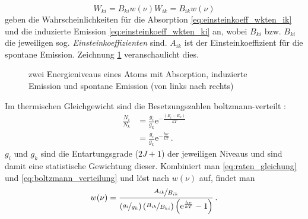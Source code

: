 \begin{subequations}\label{eq:einsteinkoeff_wkten}
	\begin{equation}\label{eq:einsteinkoeff_wkten_ik}
		W_{ki}=B_{ki}w(\nu)
	\end{equation}
	\begin{equation}\label{eq:einsteinkoeff_wkten_ki}
		W_{ik}=B_{ik}w(\nu)
	\end{equation}	
\end{subequations}
geben die Wahrscheinlichkeiten für die Absorption
\eqref{eq:einsteinkoeff_wkten_ik} und die induzierte Emission
\eqref{eq:einsteinkoeff_wkten_ki} an, wobei $B_{ki}$ bzw. $B_{ki}$ die
jeweiligen sog.
\textit{Einsteinkoeffizienten} sind. $A_{ik}$ ist der Einsteinkoeffizient für
die spontane Emission. Zeichnung \ref{fig:einstein_koeffizienten}
veranschaulicht dies.
\begin{figure}[h]
	\centering
	\caption[Einsteinkoeffizienten]{zwei Energieniveaus eines Atoms mit Absorption,
	induzierte Emission und spontane Emission (von links nach
	rechts)}\label{fig:einstein_koeffizienten}
\end{figure}
Im thermischen Gleichgewicht sind die Besetzungszahlen
boltzmann-verteilt \cite{demtroeder:ex3}:
\begin{equation}\label{eq:boltzmann_verteilung}
	\begin{split}
		\frac{N_i}{N_k}&=\frac{g_i}{g_k}\mathrm{e}^{-\frac{(E_i-E_k)}{kT}}\\[0.2cm]
		&=\frac{g_i}{g_k}\mathrm{e}^{-\frac{h\nu}{kT}}\,.
	\end{split}	
\end{equation}
$g_i$ und $g_k$ sind die Entartungsgrade ($2J+1$) der jeweiligen Niveaus und
sind damit eine statistische Gewichtung dieser.
Kombiniert man \eqref{eq:raten_gleichung} und \eqref{eq:boltzmann_verteilung}
und löst nach $w(\nu)$ auf, findet man
\begin{equation}\label{eq:spektrale_energiedichte_1}
	w(\nu)=\frac{\nicefrac{A_{ik}}{B_{ik}}}{\left(\nicefrac{g_i}{g_k}\right)\left(\nicefrac{B_{ik}}{B_{ki}}\right)\left(\mathrm{e}^\frac{h\nu}{kT}-1\right)}\,.
\end{equation}
